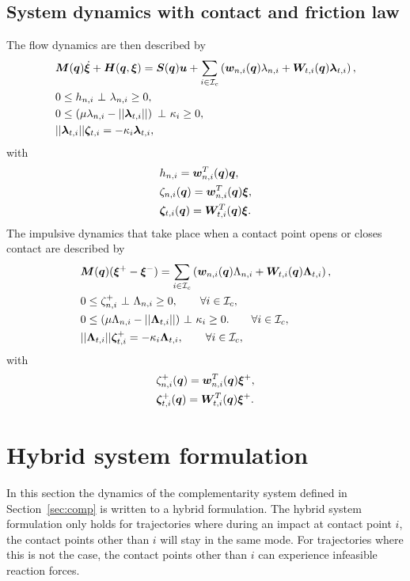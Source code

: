 \documentclass[../DC2017114Bouma.tex]{subfiles}
\begin{document}
\subsection{System dynamics with contact and friction law}
The flow dynamics are then described by
\begin{align}
&\Mb(\qb)\dot{\xib} + \Hb(\qb,\xib) = \Sb(\qb)\ub + \sum_{i\in\Ic_c}\left(\wb_{n,i}(\qb)\lambda_{n,i} + \Wb_{t,i}(\qb)\lambdab_{t,i} \right), \label{eq:ncpcontact1}\\
&0\leq h_{n,i}\ \bot\ \lambda_{n,i} \geq 0,\label{eq:ncpcontact2}\\
&0\leq \left(\mu\lambda_{n,i} - ||\lambdab_{t,i}||\right)\ \bot\ \kappa_i \geq 0,\label{eq:ncpcontact3}\\
&||\lambdab_{t,i}||\zetab_{t,i} = -\kappa_i\lambdab_{t,i},\label{eq:ncpcontact4}
\end{align}
with 
\begin{align}
&h_{n,i} = {\boldsymbol{w}}_{n,i}^T({\boldsymbol{q}}){\boldsymbol{q}},\label{eq:h}\\
&\zeta_{n,i}({\boldsymbol{q}}) = {\boldsymbol{w}}^T_{n,i}({\boldsymbol{q}}) \boldsymbol{\xi},  \label{eq:zetan}\\
&\boldsymbol{\zeta}_{t,i}({\boldsymbol{q}}) = {\boldsymbol{W}}^T_{t,i}({\boldsymbol{q}}) \boldsymbol{\xi}. \label{eq:zetab}
\end{align}
The impulsive dynamics that take place when a contact point opens or closes contact are described by
\begin{align}
&{\boldsymbol{M}}({\boldsymbol{q}})(\boldsymbol{\xi}^+ - \boldsymbol{\xi}^-) = \sum_{i\in\mathcal{I}_c}\left( {\boldsymbol{w}}_{n,i}({\boldsymbol{q}})\Lambda_{n,i} + {\boldsymbol{W}}_{t,i}({\boldsymbol{q}})\boldsymbol{\Lambda}_{t,i}\right), \label{eq:ncpimpact1}\\
&0\leq \zeta_{n,i}^+\ \bot\ \Lambda_{n,i} \geq 0, \qquad \forall i\in\mathcal{I}_c,\label{eq:ncpimpact2}\\
&0 \leq (\mu\Lambda_{n,i} - ||\boldsymbol{\Lambda}_{t,i}||)\ \bot\ \kappa_i \geq 0. \qquad \forall i\in\mathcal{I}_c,\label{eq:ncpimpact3}\\
&||\boldsymbol{\Lambda}_{t,i}||\boldsymbol{\zeta}_{t,i}^+ = -\kappa_i\boldsymbol{\Lambda}_{t,i},\qquad \forall i\in\mathcal{I}_c,\label{eq:ncpimpact4}
\end{align}
with 
\begin{align}
&\zeta^+_{n,i}({\boldsymbol{q}}) = {\boldsymbol{w}}^T_{n,i}({\boldsymbol{q}}) \boldsymbol{\xi}^+,\\
&\boldsymbol{\zeta}^+_{t,i}({\boldsymbol{q}}) = {\boldsymbol{W}}^T_{t,i}({\boldsymbol{q}}) \boldsymbol{\xi}^+.\label{eq:ncpimpactend}
\end{align}

\section{Hybrid system formulation}
In this section the dynamics of the complementarity system defined in Section~\ref{sec:comp} is written to a hybrid formulation. The hybrid system formulation only holds for trajectories where during an impact at contact point $i$, the contact points other than $i$ will stay in the same mode. For trajectories where this is not the case, the contact points other than $i$ can experience infeasible reaction forces.
\end{document}
